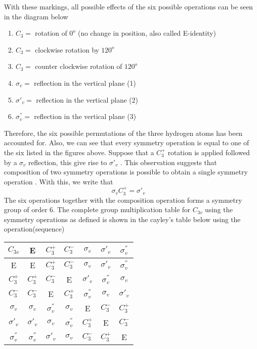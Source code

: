 \documentclass[a4paper, 12pt, openany]{report}
\begin{document}
With these markings, all possible effects of the six possible operations can be seen in the diagram below \begin{enumerate}
	\item $C_3 =$ rotation of $0^o$ (no change in position, also called E-identity)
	\item $C_3 =$ clockwise rotation by $120^o$
	\item $C_3 =$ counter clockwise rotation of $120^o$
	\item $\sigma_v=$ reflection in the  vertical plane (1)
		\item $\sigma'_v=$ reflection in the  vertical plane (2)
		\item $\sigma_v^{''}=$ reflection in the  vertical plane (3)
\end{enumerate}
 Therefore, the six possible permutations of the three hydrogen atoms has been accounted for. Also, we can see that every symmetry operation is equal to one of the six listed in the figures above. Suppose that  a $C_3^+$ rotation is applied followed by a $\sigma_v$ reflection, this give rise to $\sigma'_v$ . This observation suggests that composition of two symmetry operations is possible to obtain a single symmetry operation . With this, we write that 
 $$\sigma_v C_3^+=\sigma'_v$$
 The six operations together with the composition operation forms a \break symmetry group of order 6. The complete group multiplication table for $C_{3v}$ using the  symmetry operations as defined is shown in the cayley's table below using the   operation(sequence)
 \begin{table}[H]\centering
 \begin{tabular}{c|cccccc}
 	$C_{3v}$&E&$C_3^+$&$C_3^-$&$\sigma_v$&$\sigma'_v$&$\sigma_v^{''}$\\\hline
 E&E&$C_3^+$&$C_3^-$&$\sigma_v$&$\sigma'_v$&$\sigma_v^{''}$\\
 $C_3^+$&$C_3^+$&$C_3^-$&E&$\sigma'_v$&$\sigma_v^{''}$&$\sigma_v$\\
 $C_3^-$&$C_3^-$&E&$C_3^+$&$\sigma_v^{''}$&$\sigma_v$&$\sigma'_v$\\
 $\sigma_v$& $\sigma_v$&$\sigma_v^{''}$&$\sigma_v$&E&$C_3^-$&$C_3^+$\\
 $\sigma'_v$& $\sigma'_v$&$\sigma_v$&$\sigma_v^{''}$&$C_3^+$&E&$C_3^-$\\
 $\sigma_v^{''}$& $\sigma_v^{''}$& $\sigma'_v$&$\sigma_v$&$C_3^-$&$C_3^+$&E 
 \end{tabular}\end{table}
\end{document}
